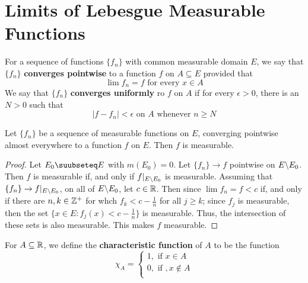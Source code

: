 \section{Limits of Lebesgue Measurable Functions}

\begin{definition}
    For a sequence of functions $\{f_n\}$ with common measurable domain $E$, we
    say that $\{f_n\}$ \textbf{converges pointwise} to a function $f$ on $A
    \subseteq E$ provided that
    \begin{equation*}
        \lim{f_n}=f \text{ for every } x \in A
    \end{equation*}
    We say that $\{f_n\}$ \textbf{converges uniformly} ro $f$ on  $A$ if for
    every $\epsilon>0$, there is an $N>0$ such that
    \begin{equation*}
        |f-f_n|<\epsilon \text{ on } A \text{ whenever } n \geq N
    \end{equation*}
\end{definition}

\begin{lemma}\label{9.2.1}
    Let $\{f_n\}$ be a sequence of measurable functions on $E$, converging
    pointwise almost everywhere to a function $f$ on  $E$. Then  $f$ is
    measurable.
\end{lemma}
\begin{proof}
    Let $E_0 \suubseteq E$ with $m(E_0)=0$. Let $\{f_n\} \xrightarrow{} f$
    pointwise on $E \backslash E_0$. Then $f$ is measurable if, and only if
    $f|_{E \backslash E_0}$ is measurable. Assuming that $\{f_n\} \xrightarrow{}
    f|_{E \backslash E_0}$, on all of $E \backslash E_0$, let $c \in \mathbb{R}$. Then since
    $\lim{f_n}=f<c$ if, and only if there are $n,k \in \mathbb{Z}^+$ for whch
    $f_k<c-\frac{1}{n}$ for all $j \geq k$; since  $f_j$ is measurable, then the
    set  $\{x \in E : f_j(x)<c-\frac{1}{n}\}$ is measurable. Thus, the
    intersection of these sets is also measurable. This makes $f$ measurable.
\end{proof}

\begin{definition}
    For $A \subseteq \mathbb{R}$, we define the \textbf{characteristic function} of $A$
    to be the function
    \begin{equation*}
        \chi_A=\begin{cases}
                1, \text{ if } x \in A  \\
                0, \text{ if }, x \notin A  \\
            \end{cases}
    \end{equation*}
\end{definition}

